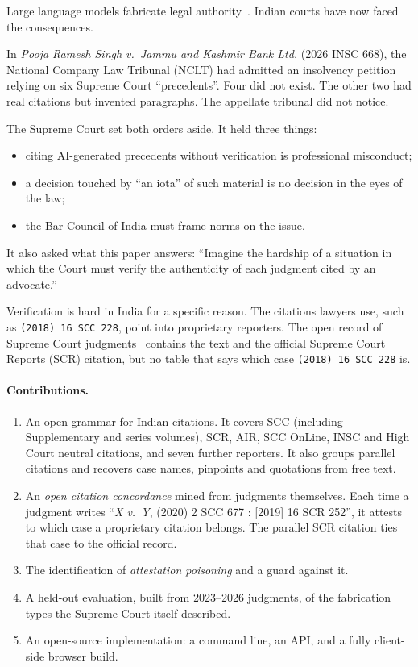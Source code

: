 \documentclass[sigconf,nonacm]{acmart}
\begin{document}
Large language models fabricate legal authority~\cite{dahl2024fictions,magesh2024hallucination}.
Indian courts have now faced the consequences.

In \emph{Pooja Ramesh Singh v.\ Jammu and Kashmir Bank Ltd.} (2026 INSC 668), the National Company
Law Tribunal (NCLT) had admitted an insolvency petition relying on six Supreme Court ``precedents''.
Four did not exist. The other two had real citations but invented paragraphs. The appellate tribunal
did not notice.

The Supreme Court set both orders aside. It held three things:
\begin{itemize}
\item citing AI-generated precedents without verification is professional misconduct;
\item a decision touched by ``an iota'' of such material is no decision in the eyes of the law;
\item the Bar Council of India must frame norms on the issue.
\end{itemize}
It also asked what this paper answers: ``Imagine the hardship of a situation in which the Court must
verify the authenticity of each judgment cited by an advocate.''

Verification is hard in India for a specific reason. The citations lawyers use, such as
\texttt{(2018) 16 SCC 228}, point into proprietary reporters. The open record of Supreme Court
judgments~\cite{scjudgments} contains the text and the official Supreme Court Reports (SCR)
citation, but no table that says which case \texttt{(2018) 16 SCC 228} is.

\paragraph{Contributions.}
\begin{enumerate}
\item An open grammar for Indian citations. It covers SCC (including Supplementary and series
volumes), SCR, AIR, SCC OnLine, INSC and High Court neutral citations, and seven further reporters. It
also groups parallel citations and recovers case names, pinpoints and quotations from free text.
\item An \emph{open citation concordance} mined from judgments themselves. Each time a judgment writes
``\emph{X v.\ Y}, (2020) 2 SCC 677 : [2019] 16 SCR 252'', it attests to which case a proprietary
citation belongs. The parallel SCR citation ties that case to the official record.
\item The identification of \emph{attestation poisoning} and a guard against it.
\item A held-out evaluation, built from 2023--2026 judgments, of the fabrication types the Supreme
Court itself described.
\item An open-source implementation: a command line, an API, and a fully client-side browser build.
\end{enumerate}
\end{document}
